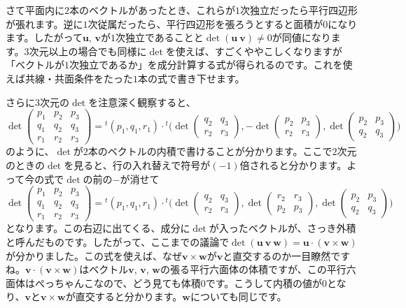 さて平面内に$2$本のベクトルがあったとき、これらが$1$次独立だったら平行四辺形が張れます。逆に$1$次従属だったら、平行四辺形を張ろうとすると面積が$0$になります。したがって$\bm{u}$, $\bm{v}$が$1$次独立であることと$\det( \bm{u} \ \bm{v} ) \neq 0$が同値になります。$3$次元以上の場合でも同様に$\det$を使えば、すごくややこしくなりますが「ベクトルが$1$次独立であるか」を成分計算する式が得られるのです。これを使えば共線・共面条件をたった$1$本の式で書き下せます。

さらに$3$次元の$\det$を注意深く観察すると、
\[
\det
\begin{pmatrix}
p_1 & p_2 & p_3 \\
q_1 & q_2 & q_3 \\
r_1 & r_2 & r_3
\end{pmatrix}
=
{}^t(p_1, q_1, r_1)
\cdot
{}^t
\Biggl(
\det
\begin{pmatrix}
q_2 & q_3 \\
r_2 & r_3
\end{pmatrix}
, 
-
\det
\begin{pmatrix}
p_2 & p_3 \\
r_2 & r_3
\end{pmatrix}
, 
\det
\begin{pmatrix}
p_2 & p_3 \\
q_2 & q_3
\end{pmatrix}
\Biggr)
\]
のように、$\det$が$2$本のベクトルの内積で書けることが分かります。ここで$2$次元のときの$\det$を見ると、行の入れ替えで符号が$(-1)$倍されると分かります。よって今の式で$\det$の前の$-$が消せて
\[
\det
\begin{pmatrix}
p_1 & p_2 & p_3 \\
q_1 & q_2 & q_3 \\
r_1 & r_2 & r_3
\end{pmatrix}
=
{}^t(p_1, q_1, r_1)
\cdot
{}^t
\Biggl(
\det
\begin{pmatrix}
q_2 & q_3 \\
r_2 & r_3
\end{pmatrix}
, 
\det
\begin{pmatrix}
r_2 & r_3 \\
p_2 & p_3
\end{pmatrix}
, 
\det
\begin{pmatrix}
p_2 & p_3 \\
q_2 & q_3
\end{pmatrix}
\Biggr)
\]
となります。この右辺に出てくる、成分に$\det$が入ったベクトルが、さっき外積と呼んだものです。したがって、ここまでの議論で$\det(\bm{u}\ \bm{v}\ \bm{w}) = \bm{u}\cdot(\bm{v}\times\bm{w})$が分かりました。この式を使えば、なぜ$\bm{v}\times\bm{w}$が$\bm{v}$と直交するのか一目瞭然ですね。$\bm{v}\cdot(\bm{v}\times\bm{w})$はベクトル$\bm{v}$, $\bm{v}$, $\bm{w}$の張る平行六面体の体積ですが、この平行六面体はぺっちゃんこなので、どう見ても体積$0$です。こうして内積の値が$0$となり、$\bm{v}$と$\bm{v}\times\bm{w}$が直交すると分かります。$\bm{w}$についても同じです。

